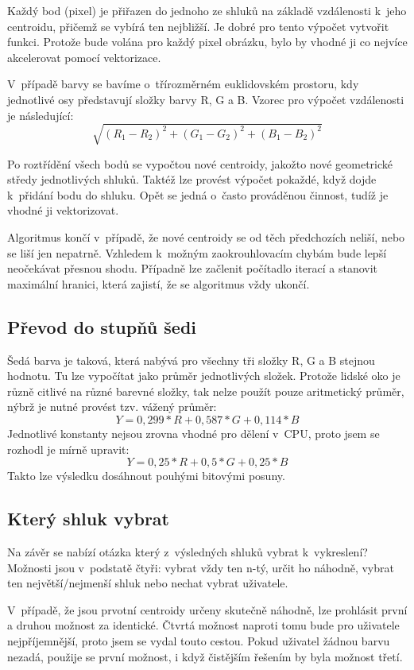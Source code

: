 \documentclass[11pt,a4paper,onecolumn,notitlepage]{article}
\begin{document}
		Každý bod (pixel) je přiřazen do jednoho ze shluků na základě vzdálenosti k~jeho centroidu, přičemž se vybírá ten nejbližší. Je dobré pro tento výpočet vytvořit funkci. Protože bude volána pro každý pixel obrázku, bylo by vhodné ji co nejvíce akcelerovat pomocí vektorizace.
		
		V~případě barvy se bavíme o~třírozměrném euklidovském prostoru, kdy jednotlivé osy představují  složky barvy R, G a B. Vzorec pro výpočet vzdálenosti je následující:
		$$\sqrt { {\left( R_1 - R_2 \right)}^2 + {\left( G_1 - G_2 \right)}^2 + {\left( B_1 - B_2 \right)}^2}$$
		
		Po roztřídění všech bodů se vypočtou nové centroidy, jakožto nové geometrické středy jednotlivých shluků. Taktéž lze provést výpočet pokaždé, když dojde k~přidání bodu do shluku. Opět se jedná o~často prováděnou činnost, tudíž je vhodné ji vektorizovat. 
	
		Algoritmus končí v~případě, že nové centroidy se od těch předchozích neliší, nebo se liší jen nepatrně. Vzhledem k~možným zaokrouhlovacím chybám bude lepší neočekávat přesnou shodu. Případně lze začlenit počítadlo iterací a stanovit maximální hranici, která zajistí, že se algoritmus vždy ukončí. \cite{wiki_kmeans}
	
	\subsection{Převod do stupňů šedi}
		Šedá barva je taková, která nabývá pro všechny tři složky R, G a B stejnou hodnotu. Tu lze vypočítat jako průměr jednotlivých složek. Protože lidské oko je různě citlivé na různé barevné složky, tak nelze použít pouze aritmetický průměr, nýbrž je nutné provést tzv. vážený průměr: \cite{IZG}
		$$Y = 0,299 * R + 0,587 * G + 0,114 * B$$
		Jednotlivé konstanty nejsou zrovna vhodné pro dělení v~CPU, proto jsem se rozhodl je mírně upravit:
		$$Y = 0,25 * R + 0,5 * G + 0,25 * B$$
		Takto lze výsledku dosáhnout pouhými bitovými posuny.
		
	\subsection{Který shluk vybrat}
		Na závěr se nabízí otázka který z~výsledných shluků vybrat k~vykreslení? Možnosti jsou v~podstatě čtyři: vybrat vždy ten n-tý, určit ho náhodně, vybrat ten největší/nejmenší shluk nebo nechat vybrat uživatele.
		
		V~případě, že jsou prvotní centroidy určeny skutečně náhodně, lze prohlásit první a druhou možnost za identické. Čtvrtá možnost naproti tomu bude pro uživatele nejpříjemnější, proto jsem se vydal touto cestou. Pokud uživatel žádnou barvu nezadá, použije se první možnost, i když čistějším řešením by byla možnost třetí.
		
\end{document}
